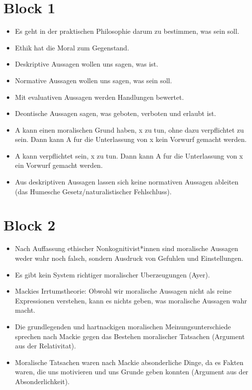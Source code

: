 \documentclass[../main.tex]{subfiles}
\begin{document}
 
\section{Block 1}
\begin{itemize}
  \item Es geht in der praktischen Philosophie darum zu bestimmen, was sein soll.
  \item Ethik hat die Moral zum Gegenstand.
  \item Deskriptive Aussagen wollen uns sagen, was ist. 
  \item Normative Aussagen wollen uns sagen, was sein soll.
  \item Mit evaluativen Aussagen werden Handlungen bewertet.
  \item Deontische Aussagen sagen, was geboten, verboten und erlaubt ist.
  \item A kann einen moralischen Grund haben, x zu tun, ohne dazu verpflichtet zu sein. Dann kann A fur die Unterlassung von x kein Vorwurf gemacht werden.
  \item A kann verpflichtet sein, x zu tun. Dann kann A fur die Unterlassung von x ein Vorwurf gemacht werden.
  \item Aus deskriptiven Aussagen lassen sich keine normativen Aussagen ableiten (das Humesche Gesetz/naturalistischer Fehlschluss).
\end{itemize}

\section{Block 2}
\begin{itemize}
	\item Nach Auffassung ethischer Nonkognitivist*innen sind moralische Aussagen weder wahr noch falsch, sondern Ausdruck von Gefuhlen und Einstellungen.
	\item Es gibt kein System richtiger moralischer Uberzeugungen (Ayer).
	\item Mackies Irrtumstheorie: Obwohl wir moralische Aussagen nicht als reine Expressionen verstehen, kann es nichts geben, was moralische Aussagen wahr macht.
	\item Die grundlegenden und hartnackigen moralischen Meinungsunterschiede sprechen nach Mackie gegen das Bestehen moralischer Tatsachen (Argument aus der Relativitat).
	\item Moralische Tatsachen waren nach Mackie absonderliche Dinge, da es Fakten waren, die uns motivieren und uns Grunde geben konnten (Argument aus der Absonderlichkeit).
\end{itemize}
\end{document}
